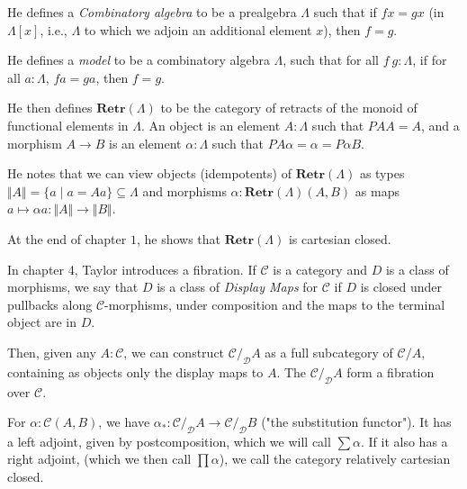 \documentclass{amsbook}
\newcommand{\Catc}[1]{\mathcal{#1}}
\newcommand{\CC}{\Catc{C}}
\theoremstyle{definition}
\begin{document}
  He defines a \textit{Combinatory algebra} to be a prealgebra $ \Lambda $ such that if $ fx = gx $ (in $ \Lambda [x] $, i.e., $ \Lambda $ to which we adjoin an additional element $ x $), then $ f = g $.

  He defines a \textit{model} to be a combinatory algebra $ \Lambda $, such that for all $ f\ g: \Lambda $, if for all $ a: \Lambda $, $ f a = g a $, then $ f = g $.

  He then defines $ \mathbf{Retr}(\Lambda) $ to be the category of retracts of the monoid of functional elements in $ \Lambda $. An object is an element $ A: \Lambda $ such that $ P A A = A $, and a morphism $ A \to B $ is an element $ \alpha: \Lambda $ such that $ P A \alpha = \alpha = P \alpha B $.

  He notes that we can view objects (idempotents) of $ \mathbf{Retr}(\Lambda) $ as types $ \Vert A \Vert = \{ a \mid a = A a \} \subseteq \Lambda $ and morphisms $ \alpha: \mathbf{Retr}(\Lambda)(A, B) $ as maps $ a \mapsto \alpha a: \Vert A \Vert \to \Vert B \Vert $.

  At the end of chapter $ 1 $, he shows that $ \mathbf{Retr}(\Lambda) $ is cartesian closed.

  In chapter 4, Taylor introduces a fibration. If $ \CC $ is a category and $ D $ is a class of morphisms, we say that $ D $ is a class of \textit{Display Maps} for $ \CC $ if $ D $ is closed under pullbacks along $ \CC $-morphisms, under composition and the maps to the terminal object are in $ D $.

  Then, given any $ A: \mathcal C $, we can construct $ \CC /_{\mathcal D} A $ as a full subcategory of $ \CC / A $, containing as objects only the display maps to $ A $. The $ \CC /_{\mathcal D} A $ form a fibration over $ \CC $.

  For $ \alpha: \CC(A, B) $, we have $ \alpha_*: \CC /_{\mathcal D} A \to \CC /_{\mathcal D} B $ ("the substitution functor"). It has a left adjoint, given by postcomposition, which we will call $ \sum \alpha $. If it also has a right adjoint, (which we then call $ \prod \alpha $), we call the category relatively cartesian closed.
\end{document}
